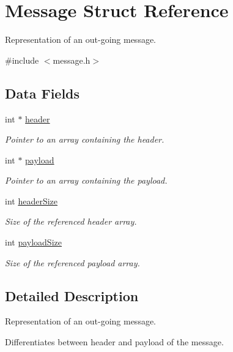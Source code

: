 \hypertarget{structMessage}{\section{Message Struct Reference}
\label{structMessage}
}


Representation of an out-\/going message.  




{\ttfamily \#include $<$message.\-h$>$}

\subsection*{Data Fields}
\begin{DoxyCompactItemize}
\item 
int $\ast$ \hyperlink{structMessage_ac5433672aa52e04391534dcd73bb1286}{header}
\begin{DoxyCompactList}\small\item\em Pointer to an array containing the header. \end{DoxyCompactList}\item 
int $\ast$ \hyperlink{structMessage_a4e4b7d09227526e0999f2ef140606c64}{payload}
\begin{DoxyCompactList}\small\item\em Pointer to an array containing the payload. \end{DoxyCompactList}\item 
int \hyperlink{structMessage_ac6c78db74f1baf3454acd76d8830489a}{header\-Size}
\begin{DoxyCompactList}\small\item\em Size of the referenced header array. \end{DoxyCompactList}\item 
int \hyperlink{structMessage_ae17de6f21df9cca8b3fc9baf27f992f8}{payload\-Size}
\begin{DoxyCompactList}\small\item\em Size of the referenced payload array. \end{DoxyCompactList}\end{DoxyCompactItemize}


\subsection{Detailed Description}
Representation of an out-\/going message. 

Differentiates between header and payload of the message. 


